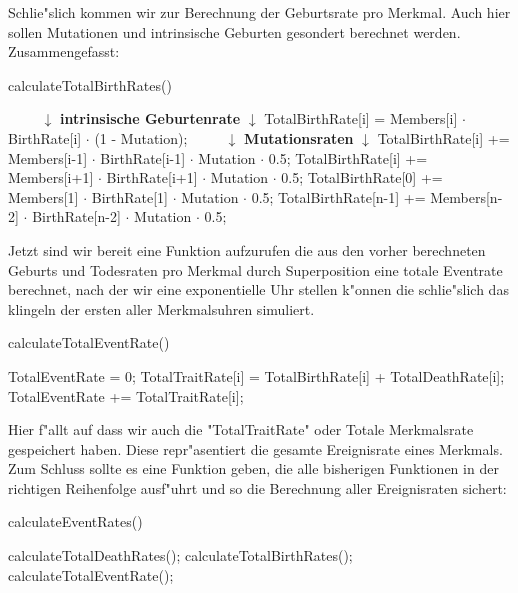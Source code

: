 \documentclass[11pt, a4paper, german]{article}
\theoremstyle{plain}
\begin{document}
	Schlie"slich kommen wir zur Berechnung der Geburtsrate pro Merkmal. Auch hier sollen Mutationen und intrinsische Geburten gesondert berechnet werden. Zusammengefasst:
	\begin{algorithm}[H]
		\caption{calculateTotalBirthRates()}
		\begin{algorithmic}[1]
			\STATE $ \qquad $ $ \downarrow $ \textbf{intrinsische Geburtenrate} $ \downarrow $
				\STATE TotalBirthRate[i] = Members[i] $ \cdot $ BirthRate[i] $ \cdot $ (1 - Mutation);
			\ENDFOR
			\STATE $ \qquad $ $ \downarrow $ \textbf{Mutationsraten} $ \downarrow $
				\STATE TotalBirthRate[i] += Members[i-1] $ \cdot $ BirthRate[i-1] $ \cdot $ Mutation $ \cdot $ 0.5;
				\STATE TotalBirthRate[i] += Members[i+1] $ \cdot $ BirthRate[i+1] $ \cdot $ Mutation $ \cdot $ 0.5;
			\ENDFOR
			\STATE TotalBirthRate[0] += Members[1] $ \cdot $ BirthRate[1] $ \cdot $ Mutation $ \cdot $ 0.5;
			\STATE TotalBirthRate[n-1] += Members[n-2] $ \cdot $ BirthRate[n-2] $ \cdot $ Mutation $ \cdot $ 0.5;
		\end{algorithmic}
	\end{algorithm}
	 Jetzt sind wir bereit eine Funktion aufzurufen die aus den vorher berechneten Geburts und Todesraten pro Merkmal durch Superposition eine totale Eventrate berechnet, nach der wir eine exponentielle Uhr stellen k"onnen die schlie"slich das klingeln der ersten aller Merkmalsuhren simuliert.
	 \begin{algorithm}[H]
 		\caption{calculateTotalEventRate()}
 		\begin{algorithmic}[1]
 			\STATE TotalEventRate = 0;
 				\STATE TotalTraitRate[i] = TotalBirthRate[i] + TotalDeathRate[i];
 				\STATE TotalEventRate += TotalTraitRate[i];
 			\ENDFOR
 		\end{algorithmic}
 	\end{algorithm}
 	Hier f"allt auf dass wir auch die "{}TotalTraitRate"{} oder Totale Merkmalsrate gespeichert haben. Diese repr"asentiert die gesamte Ereignisrate eines Merkmals.\\
 	Zum Schluss sollte es eine Funktion geben, die alle bisherigen Funktionen in der richtigen Reihenfolge ausf"uhrt und so die Berechnung aller Ereignisraten sichert:
 	\begin{algorithm}[H]
 		\caption{calculateEventRates()}
 		\begin{algorithmic}[1]
 			\STATE calculateTotalDeathRates();
 			\STATE calculateTotalBirthRates();
 			\STATE calculateTotalEventRate();
 		\end{algorithmic}
 	\end{algorithm}
	
\end{document}
